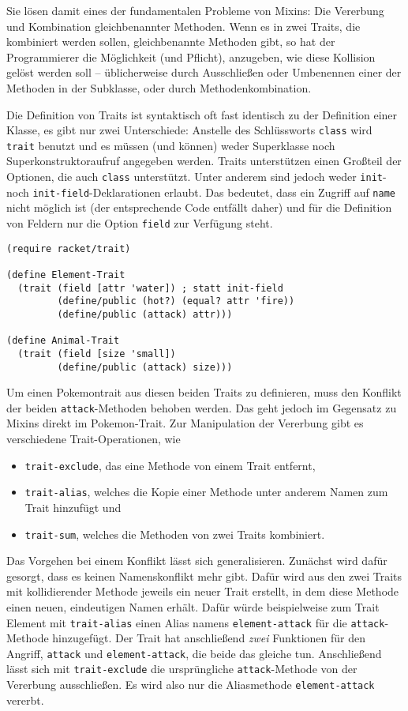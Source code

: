 Sie lösen damit eines der fundamentalen Probleme von Mixins: Die Vererbung und Kombination gleichbenannter Methoden. Wenn es in zwei Traits, die kombiniert werden sollen, gleichbenannte Methoden gibt, so hat der Programmierer die Möglichkeit (und Pflicht), anzugeben, wie diese Kollision gelöst werden soll -- üblicherweise durch Ausschließen oder Umbenennen einer der Methoden in der Subklasse, oder durch Methodenkombination.

Die Definition von Traits ist syntaktisch oft fast identisch zu der Definition einer Klasse, es gibt nur zwei Unterschiede: Anstelle des Schlüssworts \texttt{class} wird \texttt{trait} benutzt und es müssen (und können) weder Superklasse noch Superkonstruktoraufruf angegeben werden. Traits unterstützen einen Großteil der Optionen, die auch \texttt{class} unterstützt. Unter anderem sind jedoch weder \texttt{init}- noch \texttt{init-field}-Deklarationen erlaubt. Das bedeutet, dass ein Zugriff auf \texttt{name} nicht möglich ist (der entsprechende Code entfällt daher) und für die Definition von Feldern nur die Option \texttt{field} zur Verfügung steht.

\begin{lstlisting}
(require racket/trait)

(define Element-Trait
  (trait (field [attr 'water]) ; statt init-field
         (define/public (hot?) (equal? attr 'fire))
         (define/public (attack) attr)))

(define Animal-Trait
  (trait (field [size 'small])
         (define/public (attack) size)))
\end{lstlisting}

Um einen Pokemontrait aus diesen beiden Traits zu definieren, muss den Konflikt der beiden \texttt{attack}-Methoden behoben werden. Das geht jedoch im Gegensatz zu Mixins direkt im Pokemon-Trait. Zur Manipulation der Vererbung gibt es verschiedene Trait-Operationen, wie
\begin{itemize}
 \item \texttt{trait-exclude}, das eine Methode von einem Trait entfernt,
 \item \texttt{trait-alias}, welches die Kopie einer Methode unter anderem Namen zum Trait hinzufügt und
 \item \texttt{trait-sum}, welches die Methoden von zwei Traits kombiniert.
\end{itemize}

Das Vorgehen bei einem Konflikt lässt sich generalisieren. Zunächst wird dafür gesorgt, dass es keinen Namenskonflikt mehr gibt. Dafür wird aus den zwei Traits mit kollidierender Methode jeweils ein neuer Trait erstellt, in dem diese Methode einen neuen, eindeutigen Namen erhält. Dafür würde beispielweise zum Trait Element mit \texttt{trait-alias} einen Alias namens \texttt{element-attack} für die \texttt{attack}-Methode hinzugefügt. Der Trait hat anschließend \emph{zwei} Funktionen für den Angriff, \texttt{attack} und \texttt{element-attack}, die beide das gleiche tun. Anschließend lässt sich mit \texttt{trait-exclude} die ursprüngliche \texttt{attack}-Methode von der Vererbung ausschließen. Es wird also nur die Aliasmethode \texttt{element-attack} vererbt.

